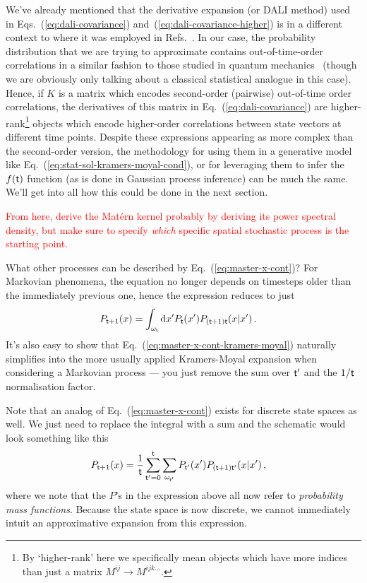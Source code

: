 We've already mentioned that the derivative expansion (or DALI method) used in Eqs.~(\ref{eq:dali-covariance}) and~(\ref{eq:dali-covariance-higher}) is in a different context to where it was employed in Refs.~\cite{sellentin2014breaking, dali}. In our case, the probability distribution that we are trying to approximate contains out-of-time-order correlations in a similar fashion to those studied in quantum mechanics~\cite{hashimoto2017out,García-Mata:2023} (though we are obviously only talking about a classical statistical analogue in this case). Hence, if $K$ is a matrix which encodes second-order (pairwise) out-of-time order correlations, the derivatives of this matrix in Eq.~(\ref{eq:dali-covariance}) are higher-rank\footnote{By `higher-rank' here we specifically mean objects which have more indices than just a matrix $M^{ij}\rightarrow M^{ijk\dots}$.} objects which encode higher-order correlations between state vectors at different time points. Despite these expressions appearing as more complex than the second-order version, the methodology for using them in a generative model like Eq.~(\ref{eq:stat-sol-kramers-moyal-cond}), or for leveraging them to infer the $f({\sf t})$ function (as is done in Gaussian process inference) can be much the same. We'll get into all how this could be done in the next section. 

\textcolor{red}{From here, derive the Mat\'{e}rn kernel probably by deriving its power spectral density, but make sure to specify \emph{which} specific spatial stochastic process is the starting point.}

What other processes can be described by Eq.~(\ref{eq:master-x-cont})? For Markovian phenomena, the equation no longer depends on timesteps older than the immediately previous one, hence the expression reduces to just
\begin{align}
P_{{\sf t}+1}(x) &= \int_{\omega_{\sf t}}{\rm d}x' P_{\sf t}(x') P_{({\sf t}+1){\sf t}}(x\vert x') \label{eq:master-x-cont-markov} \,.
\end{align}
It's also easy to show that Eq.~(\ref{eq:master-x-cont-kramers-moyal}) naturally simplifies into the more usually applied Kramers-Moyal expansion when considering a Markovian process --- you just remove the sum over ${\sf t}'$ and the $1/{\sf t}$ normalisation factor. 

Note that an analog of Eq.~(\ref{eq:master-x-cont}) exists for discrete state spaces as well. We just need to replace the integral with a sum and the schematic would look something like this
\begin{align}
P_{{\sf t}+1}(x) &= \frac{1}{{\sf t}}\sum_{{\sf t}'=0}^{\sf t}\sum_{\omega_{{\sf t}'}} P_{{\sf t}'}(x') P_{({\sf t}+1){\sf t}'}(x \vert x') \label{eq:master-x-disc} \,,
\end{align}
where we note that the $P$'s in the expression above all now refer to \emph{probability mass functions}. Because the state space is now discrete, we cannot immediately intuit an approximative expansion from this expression. 

